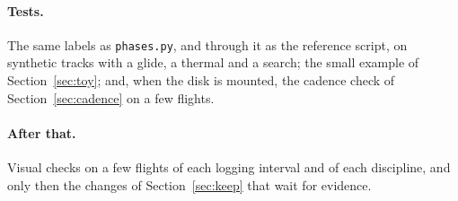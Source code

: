 \paragraph{Tests.} The same labels as \texttt{phases.py}, and through it as the reference script, on
synthetic tracks with a glide, a thermal and a search; the small example of
Section~\ref{sec:toy}; and, when the disk is mounted, the cadence check of
Section~\ref{sec:cadence} on a few flights.

\paragraph{After that.} Visual checks on a few flights of each logging interval and of each
discipline, and only then the changes of Section~\ref{sec:keep} that wait for evidence.

